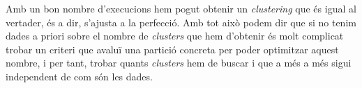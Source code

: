 \documentclass[a4paper]{article}
\begin{document}
\begin{enumerate}
Amb un bon nombre d'execucions hem pogut obtenir un \textit{clustering} que és igual al vertader, és a dir, s'ajusta a la perfecció. Amb tot això podem dir que si no tenim dades a priori sobre el nombre de \textit{clusters} que hem d'obtenir és molt complicat trobar un criteri que avaluï una partició concreta per poder optimitzar aquest nombre, i per tant, trobar quants \textit{clusters} hem de buscar i que a més a més sigui independent de com són les dades.
 \end{enumerate}
\end{document}
